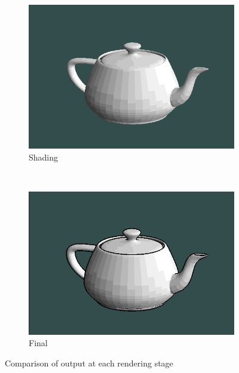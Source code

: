 \begin{figure}[h]
\begin{subfigure}[b]{0.2\textwidth}
        \includegraphics[width=\textwidth]{img/teapot-model.png}
        \caption{Shading}
        \label{fig:model-render}
    \end{subfigure}
    ~
    \begin{subfigure}[b]{0.2\textwidth}
        \includegraphics[width=\textwidth]{img/teapot-complete.png}
        \caption{Final}
        \label{fig:complete-render}
    \end{subfigure}
    \caption{Comparison of output at each rendering stage}
    \label{fig:teapot-comparison}
\end{figure}

